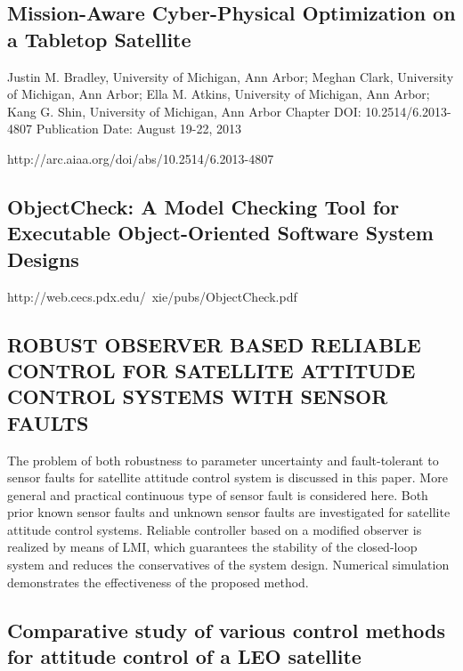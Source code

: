 \subsection{Mission-Aware Cyber-Physical Optimization on a Tabletop Satellite}


Justin M. Bradley, University of Michigan, Ann Arbor; Meghan Clark, University of Michigan, Ann Arbor; Ella M. Atkins, University of Michigan, Ann Arbor; Kang G. Shin, University of Michigan, Ann Arbor
Chapter DOI: 10.2514/6.2013-4807
Publication Date: August 19-22, 2013

http://arc.aiaa.org/doi/abs/10.2514/6.2013-4807

\subsection{ObjectCheck: A Model
Checking Tool for Executable Object-Oriented Software System
Designs}

http://web.cecs.pdx.edu/~xie/pubs/ObjectCheck.pdf

\subsection{ROBUST OBSERVER BASED RELIABLE CONTROL FOR SATELLITE
ATTITUDE CONTROL SYSTEMS WITH SENSOR FAULTS}

The problem of both robustness to parameter uncertainty and fault-tolerant
to sensor faults for satellite attitude control system is discussed in this paper. More
general and practical continuous type of sensor fault is considered here. Both prior known
sensor faults and unknown sensor faults are investigated for satellite attitude control
systems. Reliable controller based on a modified observer is realized by means of LMI,
which guarantees the stability of the closed-loop system and reduces the conservatives of
the system design. Numerical simulation demonstrates the effectiveness of the proposed
method.

\subsection{Comparative study of various control methods for attitude control of a LEO satellite}

